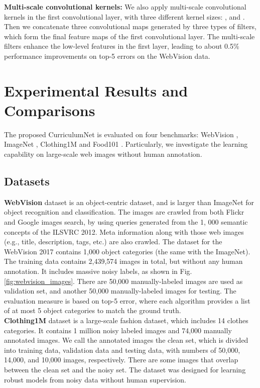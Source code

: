 \documentclass[runningheads]{llncs}
\begin{document}
\noindent \textbf{Multi-scale convolutional kernels:} We also apply multi-scale convolutional kernels in the first convolutional layer, with three different kernel sizes: ,  and . Then we concatenate three convolutional maps generated by three types of filters, which form the final feature maps of the first convolutional layer. The multi-scale filters enhance the low-level features in the first layer, leading to about 0.5\% performance improvements on top-5 errors on the WebVision data.









\section{Experimental Results and Comparisons}

The proposed CurriculumNet is evaluated on four benchmarks:  WebVision \cite{li2017webvisiondata}, ImageNet \cite{DengDSLL009}, Clothing1M \cite{xiao2015learning} and Food101 \cite{bossard2014food}. Particularly, we investigate the learning capability on large-scale web images without human annotation. 

\subsection{Datasets}

\noindent \textbf{WebVision} dataset \cite{li2017webvisiondata} is an  object-centric dataset, and is larger than  ImageNet \cite{DengDSLL009}  for object recognition  and classification. The images are crawled from both Flickr and Google images search, by using queries generated from the 1, 000 semantic concepts of the ILSVRC 2012. Meta information along with those web images (e.g., title, description, tags, etc.) are also crawled. The dataset for the WebVision 2017 contains 1,000 object categories  (the same with  the ImageNet). The training data contains 2,439,574 images in total, but without any human annotation. It includes massive noisy labels, as shown in Fig. \ref{fig:webvision_images}. There are 50,000  manually-labeled images are used as validation set, and another 50,000 manually-labeled images for testing. The evaluation measure is based on top-5 error, where each algorithm provides a list of at most 5 object categories to match the ground truth. \\

\noindent \textbf{Clothing1M} dataset \cite{xiao2015learning} is a large-scale fashion dataset, which includes 14 clothes categories. It contains 1 million noisy labeled images and 74,000 manually annotated images. We call the annotated images the clean set, which is divided into training data, validation data and testing data, with numbers of 50,000, 14,000, and 10,000 images, respectively. There are some images that overlap between the clean set and the noisy set. The dataset was designed for learning robust models from noisy data without human supervision.\\
\end{document}
